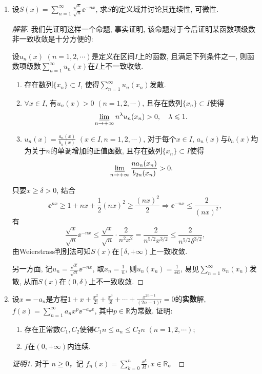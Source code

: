 \begin{quizb}
\begin{enumerate}
\item 设\(S(x)=\sum_{n=1}^{\infty}\frac{\sqrt{x}}{\sqrt{n}}\ee^{-nx}\), 
求\(S\)的定义域并讨论其连续性, 可微性.
\begin{proof}[解答]
我们先证明这样一个命题, 事实证明, 该命题对于今后证明某函数项级数非一致收敛是十分方便的: 

设\(u_n(x)\) \((n=1,2,\cdots)\)是定义在区间\(I\)上的函数, 且满足下列条件之一, 
则函数项级数\(\sum_{n=1}^{\infty}u_n(x)\)在\(I\)上不一致收敛.
\begin{enumerate}[label=(\arabic*)]
\item 存在数列\(\{x_n\}\subset I\), 使得\(\sum_{n=1}^{\infty}u_n(x_n)\)发散.
\item \(\forall x\in I\), 有\(u_n(x)>0\) \((n=1,2,\cdots)\), 且存在数列\(\{x_n\}\subset I\)使得
\[\varliminf_{n\rightarrow+\infty}n^\lambda u_n(x_n)>0,\quad \lambda\leqslant 1.\]
\item \(u_n(x)=\frac{a_n(x)}{b_n(x)}\) \((x\in I,n=1,2,\cdots)\), 
对于每个\(x\in I\), \(a_n(x)\)与\(b_n(x)\)均为关于\(n\)的单调增加的正值函数, 且存在数列\(\{x_n\}\subset I\)使得
\[\varliminf_{n\rightarrow+\infty}\frac{na_n(x_n)}{b_{2n}(x_n)}>0.\]
\end{enumerate}

只要\(x\geqslant\delta>0\), 结合\[\ee^{nx}\geqslant 1+nx+\frac{1}{2}(nx)^2
\geqslant \frac{(nx)^2}{2}\Rightarrow \ee^{-nx}\leqslant\frac{2}{(nx)^2},\]
有\[\frac{\sqrt{x}}{\sqrt{n}}\ee^{-nx}
\leqslant\frac{\sqrt{x}}{\sqrt{n}}\cdot\frac{2}{n^2x^2}
=\frac{2}{n^{5/2}x^{3/2}}\leqslant\frac{2}{n^{5/2}\delta^{3/2}},\]
由Weierstrass判别法可知\(S(x)\)在\(\left[\delta,+\infty\right)\)上一致收敛. 

另一方面, 记\(u_n=\frac{\sqrt{x}}{\sqrt{n}}\ee^{-nx}\), 
取\(x_n=\frac{1}{n}\), 则\(u_n(x_n)=\frac{1}{\ee n}\), 
易见\(\sum_{n=1}^{\infty}u_n(x_n)\)发散, 
从而\(S(x)\)在\((0,\delta)\)上不一致收敛. 
\end{proof}
\item 设\(x=-a_n\)是方程\(1+x+\frac{x^2}{2!}+\frac{x^3}{3!}+\cdots+\frac{x^{2n-1}}{(2n-1)!}=0\)的\textbf{实数}解, 
\(f(x)=\sum_{n=1}^{\infty}a_nx^p\ee^{-a_nx}\), 其中\(p\in\mathbb{R}\)为常数. 证明: 
\begin{enumerate}[label=(\arabic*)]
\item 存在正常数\(C_1,C_2\)使得\(C_1n\leqslant a_n\leqslant C_2n\) \((n=1,2,\cdots)\);
\item \(f\)在\((0,+\infty)\)内连续.
\end{enumerate}
\begin{proof}[证明1]
对于 $n \geqslant 0$，记 \(f_{n}(x)=\sum_{k=0}^{n} \frac{x^{k}}{k!}, x \in \mathbb{R}\)。


\end{proof}
\end{enumerate}
\end{quizb}
